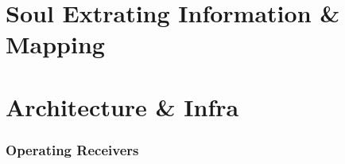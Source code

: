 \documentclass[aspectratio=169]{beamer}
\begin{document}

\section{Soul Extrating Information \& Mapping }




\section{Architecture \& Infra }


\begin{frame}
  \frametitle{Operating Receivers}



\end{frame}
\end{document}
